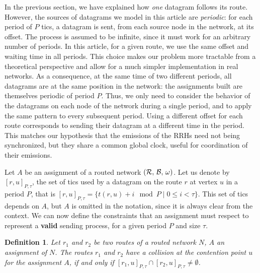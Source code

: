 \documentclass[a4paper,10pt]{journal}
\newtheorem{definition}{Definition}
\begin{document}
	In the previous section, we have explained how \emph{one} datagram follows its route.
	However, the sources of datagrams we model in this article are \emph{periodic}: for each period of $P$ tics, a datagram is sent, from each source node in the network, at its offset. The process is assumed to be infinite, since it must work for an arbitrary number of periods. In this article, for a given route, we use the same offset and waiting time in all periods. This choice makes our problem more tractable from a theoretical perspective and allow for a much simpler implementation in real networks. As a consequence, at the same time of two different periods, all datagrams are at the same position in the network: the assignments built are themselves periodic of period $P$. Thus, we only need to consider the behavior of the datagrams on each node of the network during a single period, and to apply the same pattern to every subsequent period. 
 	Using a different offset for each route corresponds to sending their datagram at a different time in the period. This matches our hypothesis that the emissions of the RRHs need not being synchronized, but they share a common global clock, useful for coordination of their emissions.

 	Let $A$ be an assignment of a routed network $(\cal{R},\,\cal{B},\,\omega)$.
    Let us denote by $[r,u]_{P,\tau}$, the set of tics used by a datagram on the route $r$ at vertex $u$ in a period $P$, that is $[r,u]_{P,\tau} = \{t(r,u) + i \mod P \mid 0 \leq i < \tau \}$. This set of tics depends on $A$, but $A$ is omitted in the notation, since it is always clear from the context. We can now define the constraints that an assignment must respect to represent a \textbf{valid}
    sending process, for a given period $P$ and size $\tau$.


    \begin{definition}
    Let $r_1$ and $r_2$ be two routes of a routed network $N$, $A$ an assignment of $N$. The routes $r_1$ and $r_2$ have a collision at the contention point $u$ for the assignment $A$, if and only if $[r_1,u]_{P,\tau} \cap [r_2,u]_{P,\tau} \neq \emptyset$.
    \end{definition}
    
\end{document}
